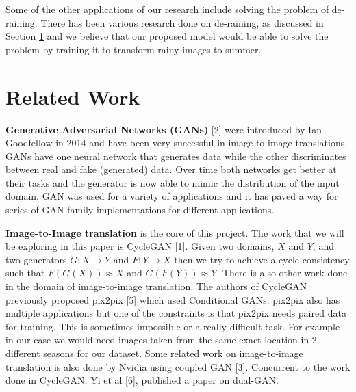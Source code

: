 \documentclass{article}
\begin{document}

Some of the other applications of our research include solving the problem of de-raining. There has been various research 
 done on de-raining, as discussed in Section \ref{relatedworks} and we believe that our proposed model would be able to solve the problem by training it to transform rainy images to summer.




\section{Related Work}
\label{relatedworks}

\textbf{Generative Adversarial Networks (GANs)} [2] were introduced by  Ian Goodfellow in 2014 and have been very successful in image-to-image translations. GANs have one neural network that generates data while the other discriminates between real and fake (generated) data. Over time both networks get better at their tasks and the generator is now able to mimic the distribution of the input domain. GAN was used for a variety of applications and it has paved a way for series of GAN-family implementations for different applications.

\textbf{Image-to-Image translation} is the core of this project. The work that we will be exploring in this paper is CycleGAN [1]. Given two domains, $X$ and $Y$, and two generators $G: X \rightarrow Y$ and $F: Y \rightarrow  X$ then we try to achieve a cycle-consistency such that $F(G(X)) \approx X$ and $G(F(Y)) \approx Y$. There is also other work done in the domain of image-to-image translation. The authors of CycleGAN previously proposed pix2pix [5] which used Conditional GANs. pix2pix also has multiple applications but one of the constraints is that pix2pix needs paired data for training. This is sometimes impossible or a really difficult task. For example in our case we would need images taken from the same exact location in 2 different seasons for our dataset. Some related work on image-to-image translation is also done by Nvidia using coupled GAN [3]. Concurrent to the work done in CycleGAN, Yi et al [6], published a paper on dual-GAN.
\end{document}
